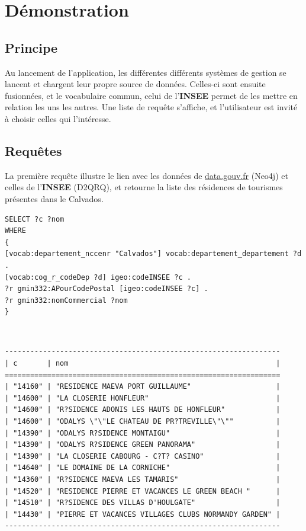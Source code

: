 \documentclass{article}
\newenvironment{DDbox}[1]{
	\begin{lrbox}{\BBbox}\begin{minipage}{\linewidth}}
		{\end{minipage}\end{lrbox}\noindent\colorbox{Zgris}{\usebox{\BBbox}} \\
		[.5cm]}
\begin{document}
\section{Démonstration}

\subsection{Principe}

Au lancement de l'application, les différentes différents systèmes de gestion se lancent et chargent leur propre source de données.
Celles-ci sont ensuite fusionnées, et le vocabulaire commun, celui de l'\textbf{INSEE} permet de les mettre en relation les uns les autres.
Une liste de requête s'affiche, et l'utilisateur est invité à choisir celles qui l'intéresse.

\subsection{Requêtes}


La première requête illustre le lien avec les données de \href{http://www.data.gouv.fr/fr}{data.gouv.fr} (Neo4j) et celles
de l'\textbf{INSEE} (D2QRQ), et retourne la liste des résidences de tourismes présentes dans le Calvados.
\medskip

\begin{DDbox}{\linewidth}
\begin{Verbatim}
SELECT ?c ?nom
WHERE
{
[vocab:departement_nccenr "Calvados"] vocab:departement_departement ?d .
[vocab:cog_r_codeDep ?d] igeo:codeINSEE ?c .
?r gmin332:APourCodePostal [igeo:codeINSEE ?c] .
?r gmin332:nomCommercial ?nom
}
\end{Verbatim}
\end{DDbox}

\begin{DDbox}{\linewidth}
	\begin{Verbatim}
-----------------------------------------------------------------
| c       | nom                                                 |
=================================================================
| "14160" | "RESIDENCE MAEVA PORT GUILLAUME"                    |
| "14600" | "LA CLOSERIE HONFLEUR"                              |
| "14600" | "R?SIDENCE ADONIS LES HAUTS DE HONFLEUR"            |
| "14600" | "ODALYS \"\"LE CHATEAU DE PR?TREVILLE\"\""          |
| "14390" | "ODALYS R?SIDENCE MONTAIGU"                         |
| "14390" | "ODALYS R?SIDENCE GREEN PANORAMA"                   |
| "14390" | "LA CLOSERIE CABOURG - C?T? CASINO"                 |
| "14640" | "LE DOMAINE DE LA CORNICHE"                         |
| "14360" | "R?SIDENCE MAEVA LES TAMARIS"                       |
| "14520" | "RESIDENCE PIERRE ET VACANCES LE GREEN BEACH "      |
| "14510" | "R?SIDENCE DES VILLAS D'HOULGATE"                   |
| "14430" | "PIERRE ET VACANCES VILLAGES CLUBS NORMANDY GARDEN" |
-----------------------------------------------------------------
\end{Verbatim}
\end{DDbox}
\end{document}
